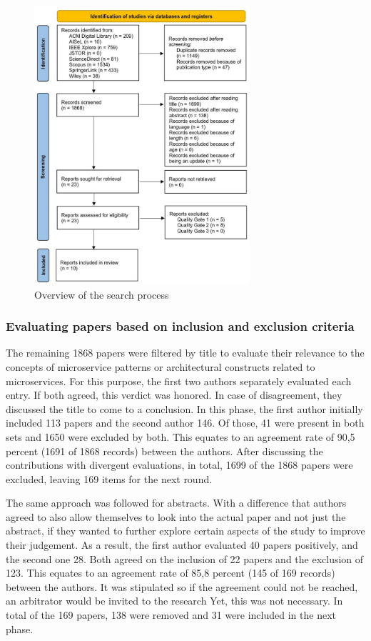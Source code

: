 \documentclass[conference]{IEEEtran}
\begin{document}
\begin{figure}[h]
    \centering 
    \includegraphics[width=8cm]{../Media/PRISMA-Flowchart.JPG}
    \caption{Overview of the search process}
    \label{fig:PRISMA}
\end{figure}

\subsubsection{Evaluating papers based on inclusion and exclusion criteria}

The remaining 1868 papers were filtered by title to evaluate their relevance to the concepts of microservice patterns or architectural constructs related to microservices. For this purpose, the first two authors separately evaluated each entry. If both agreed, this verdict was honored. In case of disagreement, they discussed the title to come to a conclusion. In this phase, the first author initially included 113 papers and the second author 146. Of those, 41 were present in both sets and 1650 were excluded by both. This equates to an agreement rate of 90,5 percent (1691 of 1868 records) between the authors. After discussing the contributions with divergent evaluations, in total, 1699 of the 1868 papers were excluded, leaving 169 items for the next round. 

The same approach was followed for abstracts. With a difference that authors agreed to also allow themselves to look into the actual paper and not just the abstract, if they wanted to further explore certain aspects of the study to improve their judgement. As a result, the first author evaluated 40 papers positively, and the second one 28. Both agreed on the inclusion of 22 papers and the exclusion of 123. This equates to an agreement rate of 85,8 percent (145 of 169 records) between the authors. It was stipulated so if the agreement could not be reached, an arbitrator would be invited to the research Yet, this was not necessary. In total of the 169 papers, 138 were removed and 31 were included in the next phase.
\end{document}
